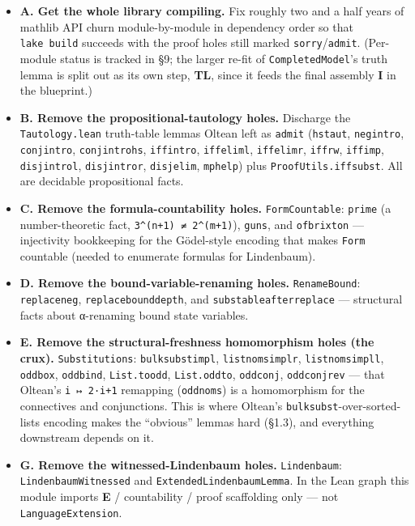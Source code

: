 \documentclass[11pt,a4paper]{article}
\renewcommand{\_}{\origtextunderscore\allowbreak}
\begin{document}
\begin{itemize}
\item
  \textbf{A. Get the whole library compiling.} Fix roughly two and a half years of mathlib API churn module-by-module in dependency order so that \texttt{lake\ build} succeeds with the proof holes still marked \texttt{sorry}/\texttt{admit}. (Per-module status is tracked in §9; the larger re-fit of \texttt{CompletedModel}'s truth lemma is split out as its own step, \textbf{TL}, since it feeds the final assembly \textbf{I} in the blueprint.)
\item
  \textbf{B. Remove the propositional-tautology holes.} Discharge the \texttt{Tautology.lean} truth-table lemmas Oltean left as \texttt{admit} (\texttt{hs\_taut}, \texttt{neg\_intro}, \texttt{conj\_intro}, \texttt{conj\_intro\_hs}, \texttt{iff\_intro}, \texttt{iff\_elim\_l}, \texttt{iff\_elim\_r}, \texttt{iff\_rw}, \texttt{iff\_imp}, \texttt{disj\_intro\_l}, \texttt{disj\_intro\_r}, \texttt{disj\_elim}, \texttt{mp\_help}) plus \texttt{ProofUtils.iff\_subst}. All are decidable propositional facts.
\item
  \textbf{C. Remove the formula-countability holes.} \texttt{FormCountable}: \texttt{prime\_2\_3} (a number-theoretic fact, \texttt{3\^{}(n+1)\ ≠\ 2\^{}(m+1)}), \texttt{guns}, and \texttt{of\_brixton} --- injectivity bookkeeping for the Gödel-style encoding that makes \texttt{Form} countable (needed to enumerate formulas for Lindenbaum).
\item
  \textbf{D. Remove the bound-variable-renaming holes.} \texttt{RenameBound}: \texttt{replace\_neg}, \texttt{replace\_bound\_depth}, and \texttt{substable\_after\_replace} --- structural facts about α-renaming bound state variables.
\item
  \textbf{E. Remove the structural-freshness homomorphism holes (the crux).} \texttt{Substitutions}: \texttt{bulk\_subst\_impl}, \texttt{list\_noms\_impl\_r}, \texttt{list\_noms\_impl\_l}, \texttt{odd\_box}, \texttt{odd\_bind}, \texttt{List.to\_odd}, \texttt{List.odd\_to}, \texttt{odd\_conj}, \texttt{odd\_conj\_rev} --- that Oltean's \texttt{i\ ↦\ 2·i+1} remapping (\texttt{odd\_noms}) is a homomorphism for the connectives and conjunctions. This is where Oltean's \texttt{bulk\_subst}-over-sorted-lists encoding makes the ``obvious'' lemmas hard (§1.3), and everything downstream depends on it.
\item
  \textbf{G. Remove the witnessed-Lindenbaum holes.} \texttt{Lindenbaum}: \texttt{LindenbaumWitnessed} and \texttt{ExtendedLindenbaumLemma}. In the Lean graph this module imports \textbf{E} / countability / proof scaffolding only --- not \texttt{LanguageExtension}.

\end{itemize}
\end{document}
